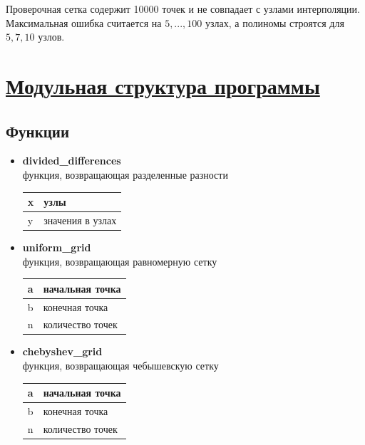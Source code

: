 \documentclass[14pt]{extarticle}
\begin{document}
	Проверочная сетка содержит 10000 точек и не совпадает с узлами интерполяции. Максимальная ошибка считается на $5, ..., 100$ узлах, а полиномы строятся для $5, 7, 10$ узлов.
		
	
	\section{\Large \underline{Модульная структура программы}}
	
	\subsection{Функции}
	\begin{itemize}
		\item \textbf{divided\_differences}\\
		функция, возвращающая разделенные разности
		\begin{table}[h]
			\begin{tabular}{|p{4cm}|p{10cm}|}
				\hline
				x & узлы \\
				\hline
				y & значения в узлах \\
				\hline
			\end{tabular}
		\end{table}
		
		\item \textbf{uniform\_grid}\\
		функция, возвращающая равномерную сетку
		\begin{table}[h]
			\begin{tabular}{|p{4cm}|p{10cm}|}
				\hline
				a & начальная точка \\
				\hline
				b & конечная точка \\
				\hline
				n & количество точек \\
				\hline
			\end{tabular}
		\end{table}
		
		\item \textbf{chebyshev\_grid}\\
		функция, возвращающая чебышевскую сетку
		\begin{table}[h]
			\begin{tabular}{|p{4cm}|p{10cm}|}
				\hline
				a & начальная точка \\
				\hline
				b & конечная точка \\
				\hline
				n & количество точек \\
				\hline
			\end{tabular}
		\end{table}
		

\end{itemize}
\end{document}
